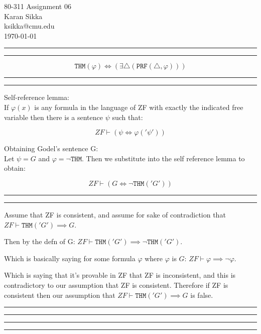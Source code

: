 \documentclass[11pt,letterpaper]{article}
\makeatletter
\newcommand{\question}[1] {\vspace{.25in} \hrule\vspace{0.5em}
\noindent{\bf #1} \vspace{0.5em}
\hrule \vspace{.10in}}
\newcommand{\myname}{Karan Sikka}
\newcommand{\myandrew}{ksikka@cmu.edu}
\newcommand{\myhwnum}{06}
\makeatother
\begin{document}
\medskip

\thispagestyle{plain}
\begin{center}                  %
{\Large 80-311 Assignment \myhwnum} \\
\myname \\
\myandrew \\
\today
\end{center}

\question{1.1}
$$ \mathtt{THM}(\varphi) \iff (\exists \triangle (\mathtt{PRF}(\triangle, \varphi))) $$

\question{1.2}
Self-reference lemma: \\
If $\varphi(x)$ is any formula in the language of ZF
with exactly the indicated free variable then there is a sentence $\psi$
such that:

$$ ZF \vdash (\psi \iff \varphi('\psi')) $$

Obtaining Godel's sentence G: \\
Let $\psi = G$ and $\varphi = \neg \mathtt{THM}$. Then we substitute into the self reference lemma to obtain:

$$ ZF \vdash (G \iff \neg \mathtt{THM}('G')) $$

\question{1.3}
Assume that ZF is consistent, and assume for sake of contradiction that $ZF \vdash \mathtt{THM}('G') \implies G$.

Then by the defn of G:
$ZF \vdash \mathtt{THM}('G') \implies \neg \mathtt{THM}('G')$.

Which is basically saying for some formula $\varphi$ where $\varphi$ is $G$:
$ZF \vdash \varphi \implies \neg \varphi$.

Which is saying that it's provable in ZF that ZF is inconsistent, and this is contradictory to our assumption that ZF is consistent. Therefore
if ZF is consistent then our assumption that $ZF \vdash \mathtt{THM}('G') \implies G$ is false.

\question{2.1}
\question{2.2}
\end{document}
